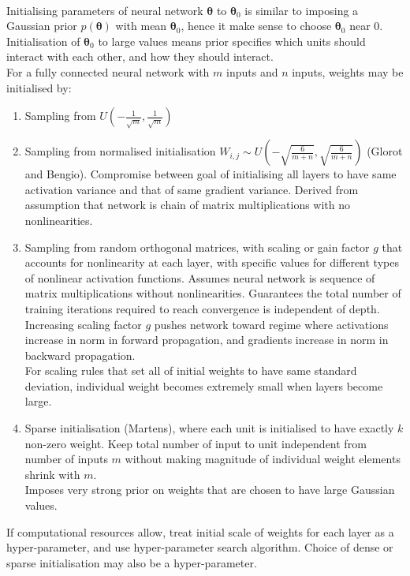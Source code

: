 \begin{remark} \\
Initialising parameters of neural network $\bm{\theta}$ to $\bm{\theta}_0$ is similar to imposing a Gaussian prior $p(\bm{\theta})$ with mean $\bm{\theta}_0$, hence it make sense to choose $\bm{\theta}_0$ near $0$. Initialisation of $\bm{\theta}_0$ to large values means prior specifies which units should interact with each other, and how they should interact.\\
For a fully connected neural network with $m$ inputs and $n$ inputs, weights may be initialised by:
\begin{enumerate}[label=\roman*.]
\setlength{\itemsep}{0pt}
\item Sampling from $U\left(-\frac{1}{\sqrt{m}},  \frac{1}{\sqrt{m}} \right)$
\item Sampling from normalised initialisation $W_{i,j} \sim U \left(-\sqrt{\frac{6}{m+n}},  \sqrt{\frac{6}{m+n}} \right)$ (Glorot and Bengio). Compromise between goal of initialising all layers to have same activation variance and that of same gradient variance. Derived from assumption that network is chain of matrix multiplications with no nonlinearities.
\item Sampling from random orthogonal matrices, with scaling or gain factor $g$ that accounts for nonlinearity at each layer, with specific values for different types of nonlinear activation functions. Assumes neural network is sequence of matrix multiplications without nonlinearities. Guarantees the total number of training iterations required to reach convergence is independent of depth.\\
Increasing scaling factor $g$ pushes network toward regime where activations increase in norm in forward propagation, and gradients increase in norm in backward propagation.\\
For scaling rules that set all of initial weights to have same standard deviation, individual weight becomes extremely small when layers become large.
\item Sparse initialisation (Martens), where each unit is initialised to have exactly $k$ non-zero weight. Keep total number of input to unit independent from number of inputs $m$ without making magnitude of individual weight elements shrink with $m$.\\
Imposes very strong prior on weights that are chosen to have large Gaussian values.
\end{enumerate}
If computational resources allow, treat initial scale of weights for each layer as a hyper-parameter, and use hyper-parameter search algorithm. Choice of dense or sparse initialisation may also be a hyper-parameter.
\end{remark}

